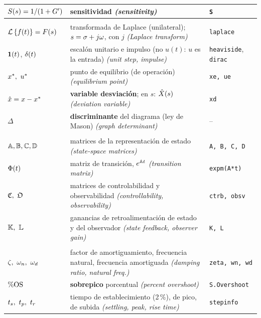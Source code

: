 {\begin{xltabular}{\linewidth}{@{}>{\raggedright\arraybackslash}p{2.9cm} >{\raggedright\arraybackslash}X >{\raggedright\arraybackslash\ttfamily\footnotesize}p{2.5cm}@{}}
$S(s)=1/(1+G')$ & sensitividad \textcolor{ctrlgris}{\textit{(sensitivity)}} & \texttt{S}\\
\midrule
{}\\
$\mathcal{L}\left\{f(t)\right\}=F(s)$ & transformada de Laplace (unilateral); $s=\sigma+j\omega$, con $j$ \textcolor{ctrlgris}{\textit{(Laplace transform)}} & \texttt{laplace}\\
$\mathbf{1}(t)$, $\delta(t)$ & escalón unitario e impulso (no $u(t)$: $u$ es la entrada) \textcolor{ctrlgris}{\textit{(unit step, impulse)}} & \texttt{heaviside}, \texttt{dirac}\\
$x^{*},\ u^{*}$ & punto de equilibrio (de operación) \textcolor{ctrlgris}{\textit{(equilibrium point)}} & \texttt{xe, ue}\\
$\hat{x}=x-x^{*}$ & \textbf{variable desviación}; en $s$: $\hat{X}(s)$ \textcolor{ctrlgris}{\textit{(deviation variable)}} & \texttt{xd}\\
$\Delta$ & \textbf{discriminante} del diagrama (ley de Mason) \textcolor{ctrlgris}{\textit{(graph determinant)}} & --\\
\midrule
{}\\
$\mathbb{A},\mathbb{B},\mathbb{C},\mathbb{D}$ & matrices de la representación de estado \textcolor{ctrlgris}{\textit{(state-space matrices)}} & \texttt{A, B, C, D}\\
$\Phi(t)$ & matriz de transición, $e^{\mathbb{A} t}$ \textcolor{ctrlgris}{\textit{(transition matrix)}} & \texttt{expm(A*t)}\\
$\mathfrak{C},\ \mathfrak{O}$ & matrices de controlabilidad y observabilidad \textcolor{ctrlgris}{\textit{(controllability, observability)}} & \texttt{ctrb, obsv}\\
$\mathbb{K},\ \mathbb{L}$ & ganancias de retroalimentación de estado y del observador \textcolor{ctrlgris}{\textit{(state feedback, observer gain)}} & \texttt{K, L}\\
\midrule
{}\\
$\zeta,\ \omega_n,\ \omega_d$ & factor de amortiguamiento, frecuencia natural, frecuencia amortiguada \textcolor{ctrlgris}{\textit{(damping ratio, natural freq.)}} & \texttt{zeta, wn, wd}\\
$\%\mathrm{OS}$ & \textbf{sobrepico} porcentual \textcolor{ctrlgris}{\textit{(percent overshoot)}} & \texttt{S.Overshoot}\\
$t_s,\ t_p,\ t_r$ & tiempo de establecimiento (2\,\%), de pico, de subida \textcolor{ctrlgris}{\textit{(settling, peak, rise time)}} & \texttt{stepinfo}\\

\end{xltabular}}
